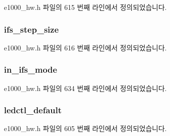 e1000\+\_\+hw.\+h 파일의 615 번째 라인에서 정의되었습니다.

\subsubsection[{\texorpdfstring{ifs\+\_\+step\+\_\+size}{ifs_step_size}}]{ ifs\+\_\+step\+\_\+size}\hypertarget{structe1000__mac__info_a0a1cdad68630133933097ed469886269}{}\label{structe1000__mac__info_a0a1cdad68630133933097ed469886269}


e1000\+\_\+hw.\+h 파일의 616 번째 라인에서 정의되었습니다.

\subsubsection[{\texorpdfstring{in\+\_\+ifs\+\_\+mode}{in_ifs_mode}}]{ in\+\_\+ifs\+\_\+mode}\hypertarget{structe1000__mac__info_a435bf13941d73fff0c98a1c6420324b2}{}\label{structe1000__mac__info_a435bf13941d73fff0c98a1c6420324b2}


e1000\+\_\+hw.\+h 파일의 634 번째 라인에서 정의되었습니다.

\subsubsection[{\texorpdfstring{ledctl\+\_\+default}{ledctl_default}}]{ ledctl\+\_\+default}\hypertarget{structe1000__mac__info_a139c03076a342ed7a693db6bbb08a13e}{}\label{structe1000__mac__info_a139c03076a342ed7a693db6bbb08a13e}


e1000\+\_\+hw.\+h 파일의 605 번째 라인에서 정의되었습니다.

